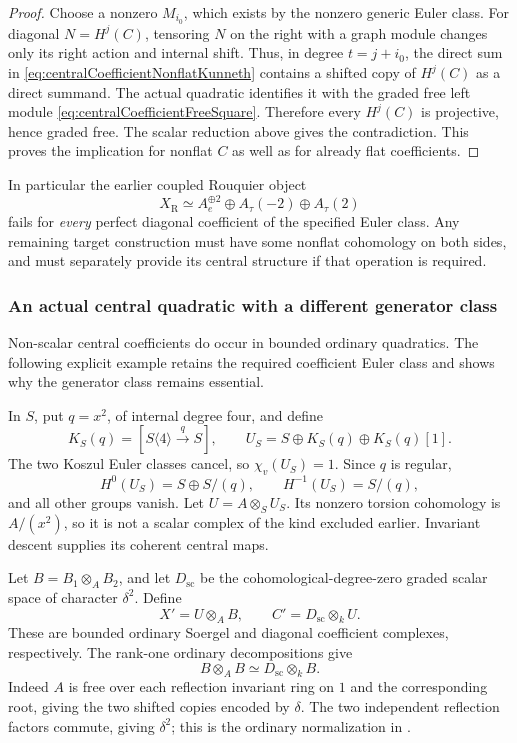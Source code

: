 \begin{proof}
Choose a nonzero \(M_{i_0}\), which exists by
the nonzero generic Euler class. For diagonal
\(N=H^j(C)\), tensoring \(N\) on the right
with a graph module changes only its right
action and internal shift. Thus, in degree
\(t=j+i_0\), the direct sum in
\eqref{eq:centralCoefficientNonflatKunneth}
contains a shifted copy of \(H^j(C)\) as a
direct summand.
The actual quadratic identifies it with the
graded free left module
\eqref{eq:centralCoefficientFreeSquare}.
Therefore every \(H^j(C)\) is projective,
hence graded free. The scalar reduction above
gives the contradiction.
This proves the implication for nonflat \(C\)
as well as for already flat coefficients.
\end{proof}

In particular the earlier coupled Rouquier object
\[
 X_{\mathrm R}\simeq A_e^{\oplus2}
              \oplus A_\tau(-2)\oplus A_\tau(2)
\]
fails for \emph{every} perfect diagonal coefficient
of the specified Euler class.
Any remaining target construction must have some
nonflat cohomology on both sides, and must separately
provide its central structure if that operation is
required.

\subsubsection{An actual central quadratic with a different generator class}

Non-scalar central coefficients do occur in bounded
ordinary quadratics. The following explicit example
retains the required coefficient Euler class and
shows why the generator class remains essential.

In \(S\), put \(q=x^2\), of internal degree four,
and define
\[
 K_S(q)=[S\langle4\rangle\xrightarrow{q}S],\qquad
 U_S=S\oplus K_S(q)\oplus K_S(q)[1].
\]
The two Koszul Euler classes cancel, so
\(\chi_v(U_S)=1\). Since \(q\) is regular,
\[
 H^0(U_S)=S\oplus S/(q),\qquad
 H^{-1}(U_S)=S/(q),
\]
and all other groups vanish.
Let \(U=A\otimes_S U_S\). Its nonzero torsion
cohomology is \(A/(x^2)\), so it is not a scalar
complex of the kind excluded earlier.
Invariant descent supplies its coherent central maps.

Let \(B=B_1\otimes_A B_2\), and let
\(D_{\mathrm{sc}}\) be the cohomological-degree-zero
graded scalar space of character \(\delta^2\).
Define
\begin{equation}\label{eq:centralCoefficientDifferentClass}
 X'=U\otimes_A B,\qquad C'=D_{\mathrm{sc}}\otimes_k U.
\end{equation}
These are bounded ordinary Soergel and diagonal
coefficient complexes, respectively.
The rank-one ordinary decompositions give
\[
 B\otimes_A B\simeq D_{\mathrm{sc}}\otimes_k B.
\]
Indeed \(A\) is free over each reflection invariant
ring on \(1\) and the corresponding root, giving
the two shifted copies encoded by \(\delta\).
The two independent reflection factors commute,
giving \(\delta^2\); this is the ordinary
normalization in \cite[\S\S3.3--3.4, pp.~1105--1107]{EW}.


